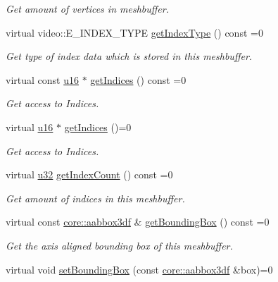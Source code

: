 \begin{DoxyCompactItemize}
\begin{DoxyCompactList}\small\item\em Get amount of vertices in meshbuffer. \end{DoxyCompactList}\item 
virtual video\+::\+E\+\_\+\+I\+N\+D\+E\+X\+\_\+\+T\+Y\+PE \hyperlink{classirr_1_1scene_1_1IMeshBuffer_a8a993431c2c35420b62a577dc18dbdc2}{get\+Index\+Type} () const =0
\begin{DoxyCompactList}\small\item\em Get type of index data which is stored in this meshbuffer. \end{DoxyCompactList}\item 
virtual const \hyperlink{namespaceirr_ae9f8ec82692ad3b83c21f555bfa70bcc}{u16} $\ast$ \hyperlink{classirr_1_1scene_1_1IMeshBuffer_a76c0013378012af7aeb6cb8f4ea8f9a1}{get\+Indices} () const =0
\begin{DoxyCompactList}\small\item\em Get access to Indices. \end{DoxyCompactList}\item 
virtual \hyperlink{namespaceirr_ae9f8ec82692ad3b83c21f555bfa70bcc}{u16} $\ast$ \hyperlink{classirr_1_1scene_1_1IMeshBuffer_a3d33a561023314677361e30cf07ae429}{get\+Indices} ()=0
\begin{DoxyCompactList}\small\item\em Get access to Indices. \end{DoxyCompactList}\item 
virtual \hyperlink{namespaceirr_a0416a53257075833e7002efd0a18e804}{u32} \hyperlink{classirr_1_1scene_1_1IMeshBuffer_a96e08662e15b1205516b87ada3301551}{get\+Index\+Count} () const =0
\begin{DoxyCompactList}\small\item\em Get amount of indices in this meshbuffer. \end{DoxyCompactList}\item 
virtual const \hyperlink{namespaceirr_1_1core_adfc8fa01b30044c55f3332a1d6c1aa19}{core\+::aabbox3df} \& \hyperlink{classirr_1_1scene_1_1IMeshBuffer_ac53fe1096756a40f25dae25911e27c51}{get\+Bounding\+Box} () const =0
\begin{DoxyCompactList}\small\item\em Get the axis aligned bounding box of this meshbuffer. \end{DoxyCompactList}\item 
virtual void \hyperlink{classirr_1_1scene_1_1IMeshBuffer_adbbfb7757dfbba7357193d2280893df6}{set\+Bounding\+Box} (const \hyperlink{namespaceirr_1_1core_adfc8fa01b30044c55f3332a1d6c1aa19}{core\+::aabbox3df} \&box)=0

\end{DoxyCompactItemize}
